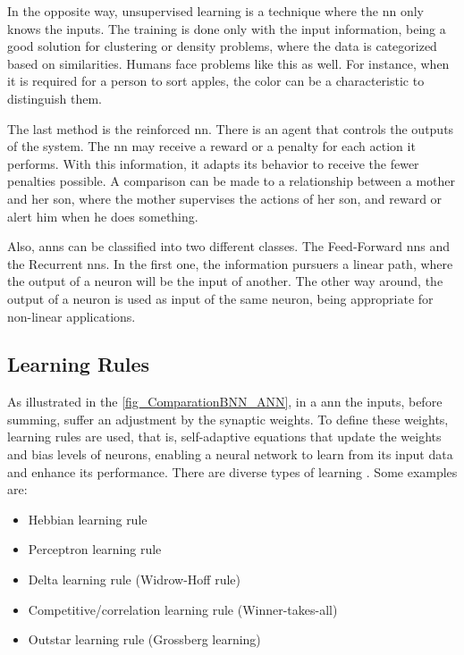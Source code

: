 In the opposite way, unsupervised learning is a technique where the \gls{nn} only knows the inputs. The training is done only with the input information, being a good solution for clustering or density problems, where the data is categorized based on similarities. Humans face problems like this as well. For instance, when it is required for a person to sort apples, the color can be a characteristic to distinguish them. 

The last method is the reinforced \gls{nn}. There is an agent that controls the outputs of the system. The \gls{nn} may receive a reward or a penalty for each action it performs. With this information, it adapts its behavior to receive the fewer penalties possible. A comparison can be made to a relationship between a mother and her son, where the mother supervises the actions of her son, and reward or alert him when he does something.

Also, \glspl{ann} can be classified into two different classes. The Feed-Forward \glspl{nn} and the Recurrent \glspl{nn}. In the first one, the information pursuers a linear path, where the output of a neuron will be the input of another. The other way around, the output of a neuron is used as input of the same neuron, being appropriate for non-linear applications. 

\subsection{Learning Rules}

As illustrated in the \autoref{fig_ComparationBNN_ANN}, in a \gls{ann} the inputs, before summing, suffer an adjustment by the synaptic weights. To define these weights, learning rules are used, that is, self-adaptive equations that update the weights and bias levels of neurons, enabling a neural network to learn from its input data and enhance its performance. There are diverse types of learning \cite{haykin2009neural}. Some examples are:

\begin{itemize}
    \item Hebbian learning rule
    \item Perceptron learning rule
    \item Delta learning rule (Widrow-Hoff rule)
    \item Competitive/correlation learning rule (Winner-takes-all)
    \item Outstar learning rule (Grossberg learning)
\end{itemize}

